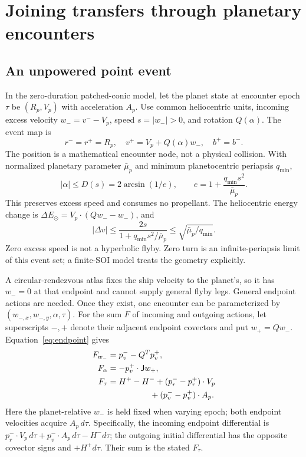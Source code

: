 \section{Joining transfers through planetary encounters}
\label{sec:encounters}
\subsection{An unpowered point event}
In the zero-duration patched-conic model, let the planet state at
encounter epoch $\tau$ be $(R_p,V_p)$ with acceleration $A_p$.
Use common heliocentric units, incoming excess velocity
$w_-=v^--V_p$, speed $s=|w_-|>0$, and rotation $Q(\alpha)$.
The event map is
\begin{equation}
 r^-=r^+=R_p,\quad
 v^+=V_p+Q(\alpha)w_-,\quad b^+=b^-.
 \label{eq:pointflyby}
\end{equation}
The position is a mathematical encounter node, not a physical collision.
With normalized planetary parameter $\bar\mu_p$ and minimum
planetocentric periapsis $q_{\min}$,
\begin{equation}
 |\alpha|\le D(s)=2\arcsin(1/e),\qquad
 e=1+\frac{q_{\min}s^2}{\bar\mu_p}.
 \label{eq:turn}
\end{equation}
This preserves excess speed and consumes no propellant.
The heliocentric energy change is
$\Delta E_\odot=V_p\cdot(Qw_--w_-)$, and
\begin{equation}
 |\Delta v|\le\frac{2s}{1+q_{\min}s^2/\bar\mu_p}
 \le\sqrt{\bar\mu_p/q_{\min}}.
\end{equation}
Zero excess speed is not a hyperbolic flyby. Zero turn is an
infinite-periapsis limit of this event set; a finite-SOI model treats
the geometry explicitly.

A circular-rendezvous atlas fixes the ship velocity to the planet's,
so it has $w_-=0$ at that endpoint and cannot supply general flyby legs.
General endpoint actions are needed. Once they exist, one encounter
can be parameterized by $(w_{-,x},w_{-,y},\alpha,\tau)$.
For the sum $F$ of incoming and outgoing actions, let superscripts
$-,+$ denote their adjacent endpoint covectors and put
$w_+=Qw_-$. Equation~\eqref{eq:endpoint} gives
\begin{equation}
 \begin{split}
 F_{w_-}&=p_v^- -Q^Tp_v^+,\\
 F_\alpha&=-p_v^+\cdot\rot w_+,\\
 F_\tau&=H^+-H^-+(p_r^- -p_r^+)\cdot V_p\\
 &\hspace{18mm}+(p_v^- -p_v^+)\cdot A_p.
 \end{split}
 \label{eq:pointgrad}
\end{equation}
Here the planet-relative $w_-$ is held fixed when varying epoch;
both endpoint velocities acquire $A_p\,d\tau$.
Specifically, the incoming endpoint differential is
$p_r^-\cdot V_p\,d\tau+p_v^-\cdot A_p\,d\tau-H^-d\tau$;
the outgoing initial differential has the opposite covector signs and
$+H^+d\tau$. Their sum is the stated $F_\tau$.

